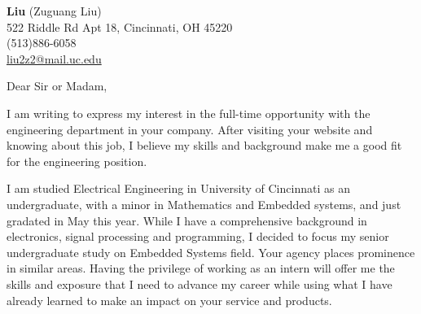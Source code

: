 \documentclass[11pt]{letter} %
\begin{document}

\begin{letter}
    {\vspace{-15pt}}


    \begin{center}
        \large \textbf{Liu} (Zuguang Liu) \\ %
        522 Riddle Rd Apt 18, Cincinnati, OH 45220 \\ (513)886-6058  \\ \href{mailto:liu2z2@mail.uc.edu}{liu2z2@mail.uc.edu}%
    \end{center}


    \signature{Liu (Zuguang Liu)} %


    \opening{Dear Sir or Madam,}

    \par I am writing to express my interest in the full-time opportunity with the engineering department in your company.
    After visiting your website and knowing about this job, I believe my skills and background make me a good fit for the engineering position.

    \par I am studied Electrical Engineering in University of Cincinnati as an undergraduate, with a minor in Mathematics and Embedded systems, and just gradated in May this year.
    While I have a comprehensive background in electronics, signal processing and programming, I decided to focus my senior undergraduate study on Embedded Systems field.
    Your agency places prominence in similar areas.
    Having the privilege of working as an intern will offer me the skills and exposure that I need to advance my career while using what I have already learned to make an impact on your service and products.



\end{letter}
\end{document}
